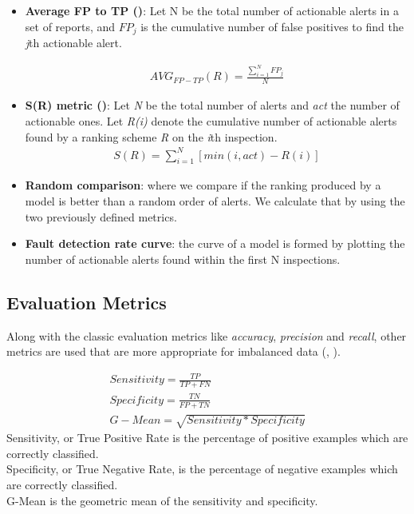 \begin{itemize}
	\item \textbf{Average FP to TP (\cite{correlation_exploitation})}: Let N be the total number of actionable alerts in a set of reports, and $FP_j$ is the cumulative
	number of false positives to find the \textit{j}th actionable alert.
	
	\begin{gather*}
	AVG_{FP-TP}(R) = \frac{\sum_{i=1}^{N} FP_j}{N}
	\end{gather*}
	
	\item \textbf{S(R) metric (\cite{z-ranking})}: Let \textit{N} be
	the total number of alerts and \textit{act} the number of actionable ones. Let \textit{R(i)} denote the cumulative number of actionable alerts found by a ranking scheme \textit{R} on the \textit{i}th inspection. \\
	\begin{gather*}
	S(R) = \sum_{i=1}^{N} [min(i,act) - R(i)]
	\end{gather*}
	\item \textbf{Random comparison}: where we compare if the ranking produced by a model is better than a random order of alerts. We calculate that by using the two previously defined metrics.
	\item \textbf{Fault detection rate curve}: the curve of a model is formed by plotting the number of actionable alerts found within the first N inspections.
	
\end{itemize}

\subsection{Evaluation Metrics}

Along with the classic evaluation metrics like \textit{accuracy}, \textit{precision} and \textit{recall}, other metrics are used that are more appropriate for imbalanced data (\cite{comparison_metrics}, \cite{iba_metric}). 


\begin{gather*}
Sensitivity = \frac{TP}{TP + FN}\\
Specificity = \frac{TN}{FP + TN}\\
G-Mean = \sqrt{Sensitivity * Specificity}
\end{gather*} 
Sensitivity, or True Positive Rate is the percentage of positive examples which
are correctly classified.\\
Specificity, or True Negative Rate, is the percentage of negative examples which are correctly classified.\\
G-Mean is the geometric mean of the sensitivity and specificity.



